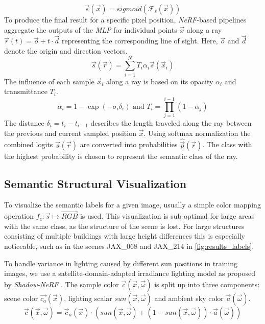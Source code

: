 \begin{equation}
	\vec{s}(\vec{x}) = \mathit{sigmoid}(\mathcal{F}_s(\vec{x}))
\end{equation}
To produce the final result for a specific pixel position, \emph{NeRF}-based pipelines aggregate the outputs of the \emph{MLP} for individual points $\vec{x}$ along a ray $\vec{r}(t) = \vec{o} + t \cdot \vec{d}$ representing the corresponding line of sight. Here, $\vec{o}$ and $\vec{d}$ denote the origin and direction vectors.
\begin{equation}
	\vec{s}(\vec{r}) = \sum_{i=1}^{N} T_i \alpha_i \vec{s}(\vec{x}_i)	
	\label{eq:semantic_rendering}
\end{equation}
The influence of each sample $\vec{x}_i$ along a ray is based on its opacity $\alpha_i$ and transmittance $T_i$.
\begin{equation}
	\alpha_i = 1 - \exp(-\sigma_i\delta_i) \text{ and } T_i = \prod_{j=1}^{i-1} (1 - \alpha_j)
\end{equation}
The distance $\delta_i = t_i -  t_{i-1}$ describes the length traveled along the ray between the previous and current sampled position $\vec{x}$.
Using softmax normalization the combined logits $\vec{s}(\vec{r})$ are converted into probabilities $\hat{\vec{p}}(\vec{r})$. The class with the highest probability is chosen to represent the semantic class of the ray.

\subsection{Semantic Structural Visualization}
\label{subsec:3d_viz}

To visualize the semantic labels for a given image, usually a simple color mapping operation $f_c: \vec{s} \mapsto \vec{RGB}$ is used. 
This visualization is sub-optimal for large areas with the same class, as the structure of the scene is lost. 
For large structures consisting of multiple buildings with large height differences this is especially noticeable, such as in the scenes JAX\_068 and JAX\_214 in \cref{fig:results_labels}.

To handle variance in lighting caused by different sun positions in training images, we use a satellite-domain-adapted irradiance lighting model as proposed by \emph{Shadow-NeRF} \cite{snerf}.
The sample color $\vec{c}(\vec{x}, \vec{\omega})$ is split up into three components: 
scene color $\vec{c_a}(\vec{x})$, lighting scalar $\mathit{sun}(\vec{x}, \vec{\omega})$ and ambient sky color $\vec{a}(\vec{\omega})$.
\begin{equation}
	\vec{c}(\vec{x}, \vec{\omega}) = \vec{c}_a(\vec{x}) \cdot (\mathit{sun}(\vec{x}, \vec{\omega}) + (1 - \mathit{sun}(\vec{x}, \vec{\omega})) \cdot \vec{a}(\vec{\omega}))
	\label{eq:satnerf_lighting_model}
\end{equation}




